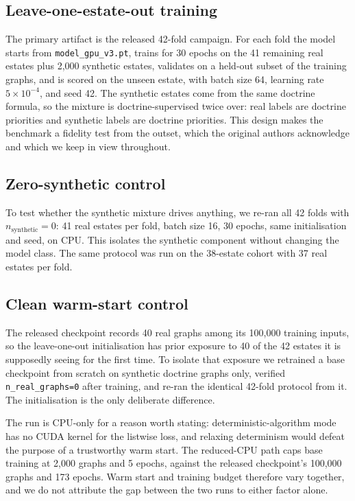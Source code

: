 \documentclass[journal,10pt]{IEEEtran}
\begin{document}
\subsection{Leave-one-estate-out training}

The primary artifact is the released 42-fold campaign. For each fold the model starts from
\texttt{model\_gpu\_v3.pt}, trains for 30 epochs on the 41 remaining real estates plus 2{,}000
synthetic estates, validates on a held-out subset of the training graphs, and is scored on the
unseen estate, with batch size 64, learning rate $5\times10^{-4}$, and seed 42. The synthetic
estates come from the same doctrine formula, so the mixture is doctrine-supervised twice over: real
labels are doctrine priorities and synthetic labels are doctrine priorities. This design makes the
benchmark a fidelity test from the outset, which the original authors acknowledge and which we keep
in view throughout.

\subsection{Zero-synthetic control}

To test whether the synthetic mixture drives anything, we re-ran all 42 folds with
$n_{\text{synthetic}}=0$: 41 real estates per fold, batch size 16, 30 epochs, same initialisation
and seed, on CPU. This isolates the synthetic component without changing the model class. The same
protocol was run on the 38-estate cohort with 37 real estates per fold.

\subsection{Clean warm-start control}

The released checkpoint records 40 real graphs among its 100{,}000 training inputs, so the
leave-one-out initialisation has prior exposure to 40 of the 42 estates it is supposedly seeing for
the first time. To isolate that exposure we retrained a base checkpoint from scratch on synthetic
doctrine graphs only, verified \texttt{n\_real\_graphs=0} after training, and re-ran the identical
42-fold protocol from it. The initialisation is the only deliberate difference.

The run is CPU-only for a reason worth stating: deterministic-algorithm mode has no CUDA kernel for
the listwise loss, and relaxing determinism would defeat the purpose of a trustworthy warm start.
The reduced-CPU path caps base training at 2{,}000 graphs and 5 epochs, against the released
checkpoint's 100{,}000 graphs and 173 epochs. Warm start and training budget therefore vary
together, and we do not attribute the gap between the two runs to either factor alone.
\end{document}
